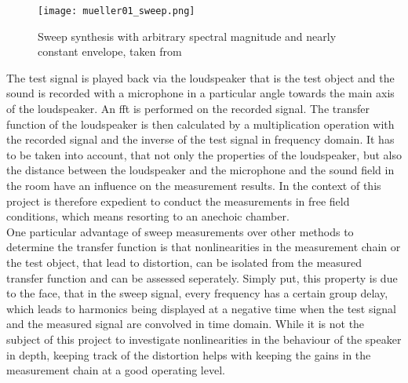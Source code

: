 \begin{figure}[htbp]
	\centering
	\texttt{[image: mueller01\_sweep.png]}
	\caption{Sweep synthesis with arbitrary spectral magnitude and nearly constant envelope, taken from \citep{mueller01}}
		\label{fig:sweep_signal}
\end{figure}

The test signal is played back via the loudspeaker that is the test object and the sound is recorded with a microphone in a particular angle towards the main axis of the loudspeaker. An \gls{fft} is performed on the recorded signal. The transfer function of the loudspeaker is then calculated by a multiplication operation with the recorded signal and the inverse of the test signal in frequency domain. It has to be taken into account, that not only the properties of the loudspeaker, but also the distance between the loudspeaker and the microphone and the sound field in the room have an influence on the measurement results. In the context of this project is therefore expedient to conduct the measurements in free field conditions, which means resorting to an anechoic chamber.\\
One particular advantage of sweep measurements over other methods to determine the transfer function is that nonlinearities in the measurement chain or the test object, that lead to distortion, can be isolated from the measured transfer function and can be assessed seperately. \citep[p. 20 f.]{mueller01} Simply put, this property is due to the face, that in the sweep signal, every frequency has a certain group delay, which leads to harmonics being displayed at a negative time when the test signal and the measured signal are convolved in time domain. While it is not the subject of this project to investigate nonlinearities in the behaviour of the speaker in depth, keeping track of the distortion helps with keeping the gains in the measurement chain at a good operating level.


